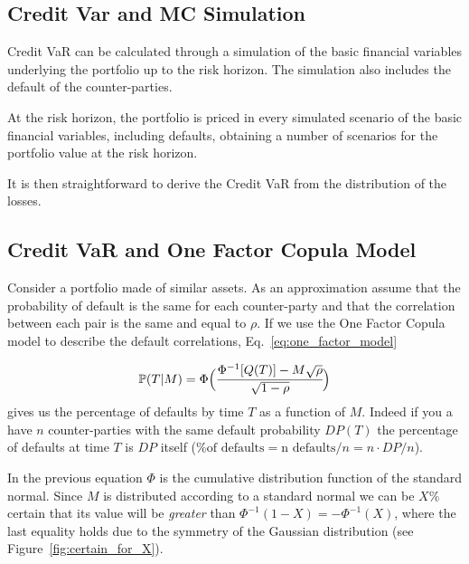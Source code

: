 \subsection{Credit Var and MC Simulation}

Credit VaR can be calculated through a simulation of the basic financial
variables underlying the portfolio up to the risk horizon. 
The simulation also includes the default of the counter-parties. 

At the risk horizon, the portfolio is priced in every simulated scenario of the basic financial variables, including defaults, obtaining a number of scenarios for the portfolio value at the risk horizon.

It is then straightforward to derive the Credit VaR from the distribution of the losses.

\subsection{Credit VaR and One Factor Copula Model}
Consider a portfolio made of similar assets. As an approximation assume that the probability of default is the same for each counter-party and that the correlation between each pair is the same and equal to $\rho$. If we use the One Factor Copula model to describe the default correlations, Eq.~\ref{eq:one_factor_model}

\[
\mathbb{P}(T|M) = \Phi\Big(\cfrac{\Phi^{-1}[Q(T)]-M\sqrt{\rho}}{\sqrt{1-\rho}}\Big)
\]
gives us the percentage of defaults by time $T$ as a function of $M$. 
Indeed if you a have $n$ counter-parties with the same default probability $DP(T)$ the percentage of defaults at time $T$ is $DP$ itself ($\textrm{\% of defaults} = \textrm{n defaults}/n = n\cdot DP/n$).

In the previous equation $\Phi$ is the cumulative distribution function of the standard normal.
Since $M$ is distributed according to a standard normal we can be $X\%$ certain that its value will be \emph{greater} than $\Phi^{-1}(1-X)=-\Phi^{-1}(X)$, where the last equality holds due to the symmetry of the Gaussian distribution (see Figure~\ref{fig:certain_for_X}).

